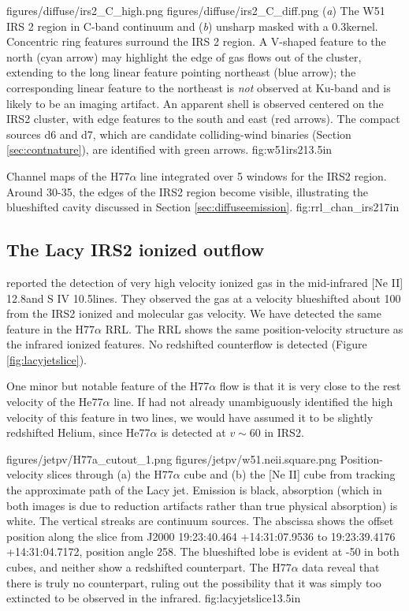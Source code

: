 \FigureTwo
{figures/diffuse/irs2_C_high.png}
{figures/diffuse/irs2_C_diff.png}
{(\textit{a}) The W51 IRS 2 region in C-band continuum and (\textit{b}) unsharp
masked with a 0.3\arcsec kernel.  Concentric ring features surround the IRS 2
region.  A V-shaped feature to the north (cyan arrow) may highlight the edge of
gas flows out of the cluster, extending to the long linear feature pointing
northeast (blue arrow); the corresponding linear feature to the northeast is
\emph{not} observed at Ku-band and is likely to be an imaging artifact.  An
apparent shell is observed centered on the IRS2 cluster, with edge
features to the south and east (red arrows).  The compact sources d6 and d7,
which are candidate colliding-wind binaries (Section \ref{sec:contnature}),
are identified with green arrows.
}
{fig:w51irs2}{1}{3.5in}

{Channel maps of the H77$\alpha$ line integrated over 5 \kms windows
for the IRS2 region.  Around 30-35\kms, the edges of the IRS2 region become
visible, illustrating the blueshifted cavity discussed in Section
\ref{sec:diffuseemission}.}
{fig:rrl_chan_irs2}{1}{7in}


\subsection{The Lacy IRS2 ionized outflow}
\label{sec:lacyjet}
\citet{Lacy2007a} reported the detection of very high velocity ionized gas
in the mid-infrared [Ne II] 12.8\um and S IV 10.5\um lines.  They observed the
gas at a velocity blueshifted about 100 \kms from the IRS2 ionized and molecular
gas velocity.  We have detected the same feature in the H77$\alpha$ RRL.
The RRL shows the same position-velocity structure as the infrared ionized
features.  No redshifted counterflow is detected (Figure \ref{fig:lacyjetslice}).

One minor but notable feature of the H77$\alpha$ flow is that it is very close
to the rest velocity of the He77$\alpha$ line.  If \citet{Lacy2007a} had not
already unambiguously identified the high velocity of this feature in two
lines, we would have assumed it to be slightly redshifted Helium, since
He77$\alpha$ is detected at $v\sim60$ \kms in IRS2.

\FigureTwo
{figures/jetpv/H77a_cutout_1.png}
{figures/jetpv/w51.neii.square.png}
{Position-velocity slices through (a) the H77$\alpha$ cube and (b) the [Ne II]
cube from \citet{Lacy2007a} tracking the approximate path of the Lacy jet.  Emission is black,
absorption (which in both images is due to reduction artifacts rather than true
physical absorption) is white.  The vertical streaks are continuum sources.
The
abscissa shows the offset position along the slice from J2000 19:23:40.464
+14:31:07.9536 to 19:23:39.4176 +14:31:04.7172, position angle 258\arcdeg.
The blueshifted lobe is evident at -50 \kms in both cubes, and neither show a
redshifted counterpart.  The H77$\alpha$ data reveal that there is truly no
counterpart, ruling out the possibility that it was simply too extincted to be
observed in the infrared.}
{fig:lacyjetslice}{1}{3.5in}


